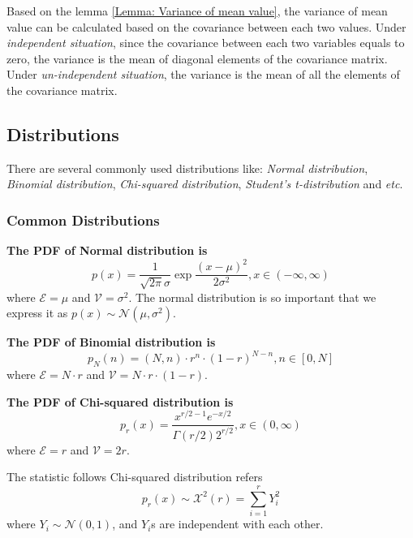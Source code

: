 \documentclass[./main.tex]{subfiles}
\begin{document}
Based on the lemma \ref{Lemma: Variance of mean value}, the variance of mean value can be calculated based on the covariance between each two values.
Under \emph{independent situation}, since the covariance between each two variables equals to zero, the variance is the mean of diagonal elements of the covariance matrix.
Under \emph{un-independent situation}, the variance is the mean of all the elements of the covariance matrix.

\subsection{Distributions}
There are several commonly used distributions like: \emph{Normal distribution}, \emph{Binomial distribution}, \emph{Chi-squared distribution}, \emph{Student's t-distribution} and \textit{etc}.

\subsubsection{Common Distributions}
\bigbreak
\textbf{The PDF of Normal distribution is}
\begin{equation}
    \label{Definition: PDF of Normal distribution}
    p(x)=
    \frac{1}{\sqrt{2\pi}\sigma} \exp{\frac{(x-\mu)^2}{2\sigma^2}},
    x \in (-\infty, \infty)
\end{equation}
where $\mathcal{E}=\mu$ and $\mathcal{V}=\sigma^2$.
The normal distribution is so important that we express it as $p(x) \sim \mathcal{N}(\mu, \sigma^2)$.

\bigbreak
\textbf{The PDF of Binomial distribution is}
\begin{equation}
    \label{Definition: PDF of Binomial distribution}
    p_N(n)=
    (N, n) \cdot r^n \cdot (1-r)^{N-n},
    n \in [0, N]
\end{equation}
where $\mathcal{E}=N \cdot r$ and $\mathcal{V}=N \cdot r \cdot (1-r)$.

\bigbreak
\textbf{The PDF of Chi-squared distribution is}
\begin{equation}
    \label{Definition: PDF of Chi-squared distribution}
    p_r(x)=
    \frac{x^{r/2-1} e^{-x/2}}{\Gamma(r/2) 2^{r/2}},
    x \in (0, \infty)
\end{equation}
where $\mathcal{E}=r$ and $\mathcal{V}=2r$.

The statistic follows Chi-squared distribution refers
\begin{equation*}
    p_r(x) \sim \mathcal{X}^2(r) = \sum_{i=1}^{r} Y_i^2
\end{equation*}
where $Y_i \sim \mathcal{N}(0, 1)$, and $Y_i$s are independent with each other.
\end{document}
